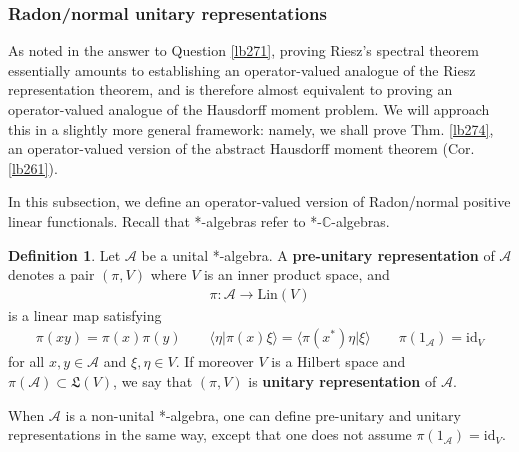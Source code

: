 \documentclass[12pt,b5paper,notitlepage]{article}
\theoremstyle{definition}
\newtheorem{df}{Definition}[subsection]
\theoremstyle{plain}
\newcommand{\fk}{\mathfrak}
\newcommand{\id}{\mathrm{id}}
\newcommand{\bk}[1]{\langle {#1}\rangle}
\newcommand{\scr}{\mathscr}
\newcommand{\Cbb}{\mathbb C}
\newcommand{\Fbb}{\mathbb F}
\newcommand{\Lin}{\mathrm{Lin}}
\newcommand{\SA}{\mathscr A}
\newcommand{\hqed}{\hfill\qedsymbol}
\numberwithin{equation}{section}
\begin{document}
\subsubsection{Radon/normal unitary representations}




\begin{comment}
\begin{df}
Let $\scr A$ and $\scr B$ be *-$\Fbb$-algebras. A linear map $\varphi:\scr A\rightarrow\scr B$ is called a \textbf{*-homomorphism} \index{00@*-homomorphism} if it satisfies
\begin{align*}
\varphi(xy)=\varphi(x)\varphi(y)\qquad\varphi(x^*)=\varphi(x)^*
\end{align*}
for all $x,y\in\scr A$. If $\scr A$ and $\scr B$ are both unital, a *-homomorphism $\varphi:\scr A\rightarrow\scr B$ is called \textbf{unital} \index{00@Unital *-homomorphism} if
\begin{align*}
\varphi(1_{\scr A})=1_{\scr B}
\end{align*}
\end{df}
\end{comment}


As noted in the answer to Question \ref{lb271}, proving Riesz's spectral theorem essentially amounts to establishing an operator-valued analogue of the Riesz representation theorem, and is therefore almost equivalent to proving an operator-valued analogue of the Hausdorff moment problem. We will approach this in a slightly more general framework: namely, we shall prove Thm. \ref{lb274}, an operator-valued version of the abstract Hausdorff moment theorem (Cor. \ref{lb261}).

In this subsection, we define an operator-valued version of Radon/normal positive linear functionals. Recall that *-algebras refer to *-$\Cbb$-algebras.


\begin{df}\label{lb347}
Let $\scr A$ be a unital *-algebra. A \textbf{pre-unitary representation} of $\scr A$  denotes a pair $(\pi,V)$ where $V$ is an inner product space, and
\begin{align*}
\pi:\scr A\rightarrow\Lin(V)
\end{align*}
is a linear map satisfying
\begin{align*}
\pi(xy)=\pi(x)\pi(y)\qquad\bk{\eta|\pi(x)\xi}=\bk{\pi(x^*)\eta|\xi}\qquad\pi(1_{\scr A})=\id_V
\end{align*}
for all $x,y\in\scr A$ and $\xi,\eta\in V$. If moreover $V$ is a Hilbert space and $\pi(\SA)\subset\fk L(V)$, we say that $(\pi,V)$ is \textbf{unitary representation} of $\scr A$. 

When $\SA$ is a non-unital *-algebra, one can define pre-unitary and unitary representations in the same way, except that one does not assume $\pi(1_\SA)=\id_V$. \hqed 
\end{df}
\end{document}
